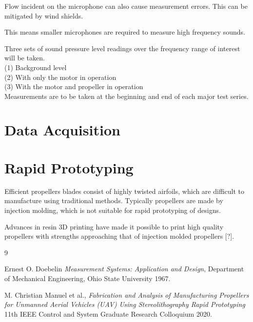 \documentclass{article}
\begin{document}
Flow incident on the microphone can also cause measurement errors. This can be mitigated by wind shields.

This means smaller microphones are required to measure high frequency sounds.


Three sets of sound pressure level readings over the frequency range of interest will be taken. \\
(1) Background level \\
(2) With only the motor in operation \\
(3) With the motor and propeller in operation \\

Measurements are to be taken at the beginning and end of each major test series.


\section{Data Acquisition}

\section{Rapid Prototyping}

Efficient propellers blades consist of highly twisted airfoils, which are difficult to manufacture using traditional methods.
Typically propellers are made by injection molding, which is not suitable for rapid prototyping of designs.

Advances in resin 3D printing have made it possible to print high quality propellers with strengths approaching that of injection molded propellers [?].


\begin{thebibliography}{9}


  Ernest O. Doebelin
  \emph{Measurement Systems: Application and Design},
  Department of Mechanical Engineering, Ohio State University
  1967.

  M. Christian Manuel et al.,
  \emph{Fabrication and Analysis of Manufacturing Propellers for Unmanned Aerial Vehicles (UAV) Using Stereolithography Rapid Prototyping}
  11th IEEE Control and System Graduate Research Colloquium
  2020.


\end{thebibliography}
\end{document}
